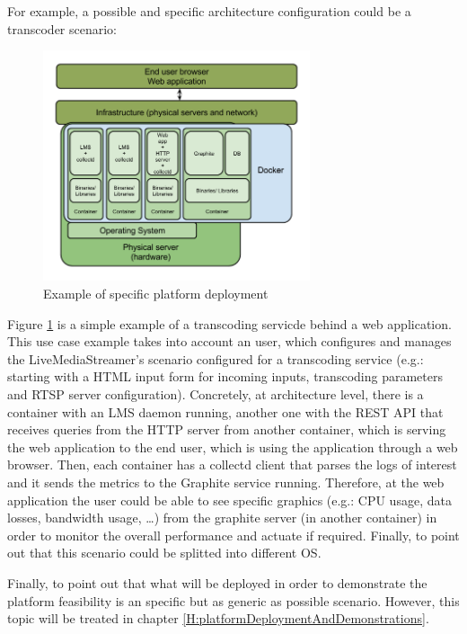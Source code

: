 For example, a possible and specific architecture configuration could be a transcoder scenario:

\begin{figure}[!htb]
\begin{center}
\includegraphics[width=0.7\textwidth]{./images/exampleArch.png}
\caption{Example of specific platform deployment}
\label{F:exampleArch}
\end{center}
\end{figure}

Figure \ref{F:exampleArch} is a simple example of a transcoding servicde behind a web application. This use case example takes into account an user, which configures and manages the LiveMediaStreamer's scenario configured for a transcoding service (e.g.: starting with a HTML input form for incoming inputs, transcoding parameters and RTSP server configuration). Concretely, at architecture level, there is a container with an LMS daemon running, another one with the REST API that receives queries from the HTTP server from another container, which is serving the web application to the end user, which is using the application through a web browser. Then, each container has a collectd client that parses the logs of interest and it sends the metrics to the Graphite service running. Therefore, at the web application the user could be able to see specific graphics (e.g.: CPU usage, data losses, bandwidth usage, \ldots) from the graphite server (in another container) in order to monitor the overall performance and actuate if required. Finally, to point out that this scenario could be splitted into different OS. 

Finally, to point out that what will be deployed in order to demonstrate the platform feasibility is an specific but as generic as possible scenario. However, this topic will be treated in chapter \ref{H:platformDeploymentAndDemonstrations}.


